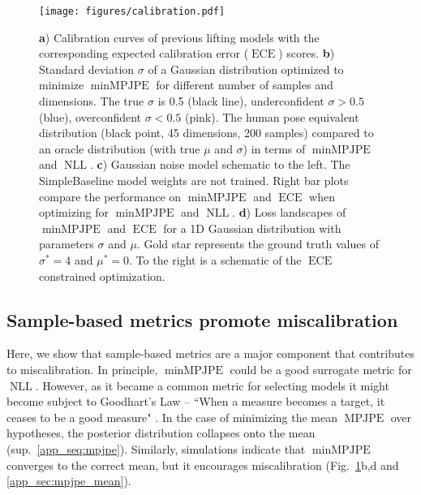 \documentclass{article} \usepackage{iclr2023_conference,times}
\begin{document}
    \begin{figure}[t]
        \begin{center}
            \texttt{[image: figures/calibration.pdf]}
        \end{center}
        \caption{
        \textbf{a}) Calibration curves of previous lifting models with the corresponding expected calibration error ($\operatorname{ECE}$) scores.
        \textbf{b}) Standard deviation $\sigma$ of a Gaussian distribution optimized to minimize $\operatorname{minMPJPE}$ for different number of samples and dimensions. The true $\sigma$ is 0.5 (black line), underconfident $\sigma > 0.5$ (blue), overconfident $\sigma < 0.5$ (pink). The human pose equivalent distribution (black point, 45 dimensions, 200 samples) compared to an oracle distribution (with true $\mu$ and $\sigma$) in terms of $\operatorname{minMPJPE}$ and $\operatorname{NLL}$.
        \textbf{c}) Gaussian noise model schematic to the left. The SimpleBaseline model weights are not trained. Right bar plots compare the performance on $\operatorname{minMPJPE}$ and $\operatorname{ECE}$ when optimizing for $\operatorname{minMPJPE}$ and $\operatorname{NLL}$.
        \textbf{d}) Loss landscapes of $\operatorname{minMPJPE}$ and $\operatorname{ECE}$ for a 1D Gaussian distribution with parameters $\sigma$ and $\mu$. Gold star represents the ground truth values of $\sigma^* = 4$ and $\mu^* = 0$. To the right is a schematic of the $\operatorname{ECE}$ constrained optimization.
        }
        \label{fig:calibration}
    \end{figure}
  
    \subsection{Sample-based metrics promote miscalibration}
    \label{sec:simple_toy}
    Here, we show that sample-based metrics are a major component that contributes to miscalibration.
    In principle, $\operatorname{minMPJPE}$ could be a good surrogate metric for $\operatorname{NLL}$.
    However, as it became a common metric for selecting models it might become subject to Goodhart's Law \citep{Goodhart1975}  --  ``When a measure becomes a target, it ceases to be a good measure" \citep{Strathern1997-nr}.
    In the case of minimizing the mean $\operatorname{MPJPE}$ over hypotheses, the posterior distribution collapses onto the mean (sup.~\ref{app_seq:mpjpe}). Similarly, simulations indicate that $\operatorname{minMPJPE}$ converges to the correct mean, but it encourages miscalibration (Fig.~\ref{fig:calibration}b,d and \ref{app_sec:mpjpe_mean}).
    
\end{document}
